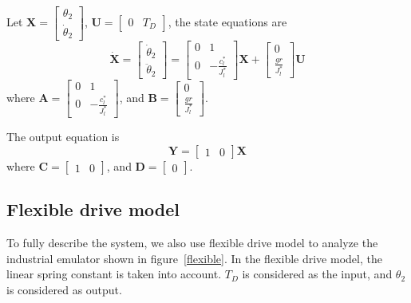 \documentclass[a4paper, 12pt]{article}
\begin{document}
Let $\mathbf{X} = \begin{bmatrix}
\theta_2	\\
\dot{\theta}_2	
\end{bmatrix}
$, 
$\mathbf{U} = \begin{bmatrix}
0 & T_D
\end{bmatrix}
$, the state equations are
\begin{equation} \label{rigidbodystate}
\mathbf{\dot{X}} = 
\begin{bmatrix}
\dot{\theta}_2 \\
\ddot{\theta}_2
\end{bmatrix} = 
\begin{bmatrix}
0	&	1	\\
0	&	-\frac{c_l^*}{J_l^*}
\end{bmatrix} \mathbf{X} +
\begin{bmatrix}
0\\
\frac{gr}{J_l^*}
\end{bmatrix} \mathbf{U}
\end{equation}
where $\mathbf{A} = \begin{bmatrix}
0	&	1	\\
0	&	-\frac{c_l^*}{J_l^*}
\end{bmatrix}$,
and $\mathbf{B} = \begin{bmatrix}
0\\
\frac{gr}{J_l^*}
\end{bmatrix}$.

The output equation is 
\begin{equation}
\mathbf{Y} = %
\begin{bmatrix}
1	&	0
\end{bmatrix} \mathbf{X}
\end{equation}
where $\mathbf{C} =  \begin{bmatrix}
1	&	0
\end{bmatrix}$, and $\mathbf{D} = \begin{bmatrix} 0 \end{bmatrix}$.

\subsection{Flexible drive model}
To fully describe the system, we also use flexible drive model to analyze the industrial emulator shown in figure~\ref{flexible}. In the flexible drive model, the linear spring constant is taken into account. $T_D$ is considered as the input, and $\theta_2$ is considered as output. 
\end{document}
